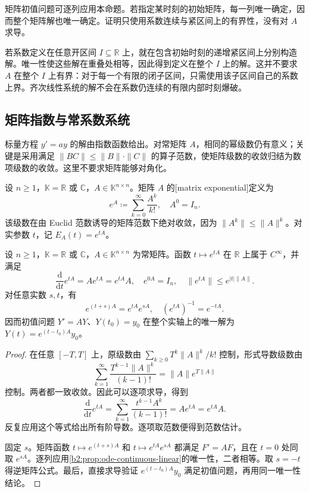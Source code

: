 矩阵初值问题可逐列应用本命题。若指定某时刻的初始矩阵，每一列唯一确定，因而整个矩阵解也唯一确定。证明只使用系数连续与紧区间上的有界性，没有对 \(A\) 求导。

\ProseParagraphBreak

若系数定义在任意开区间 \(I\subseteq\mathbb R\) 上，就在包含初始时刻的递增紧区间上分别构造解。唯一性使这些解在重叠处相等，因此得到定义在整个 \(I\) 上的解。这并不要求 \(A\) 在整个 \(I\) 上有界：对于每一个有限的闭子区间，只需使用该子区间自己的系数上界。齐次线性系统的解不会在系数仍连续的有限内部时刻爆破。

\subsection{矩阵指数与常系数系统}
\label{b2:subsec:070206}

标量方程 \(y'=ay\) 的解由指数函数给出。对常矩阵 \(A\)，相同的幂级数仍有意义；关键是采用满足 \(\|BC\|\leq\|B\|\cdot\|C\|\) 的算子范数，使矩阵级数的收敛归结为数项级数的收敛。这里不要求矩阵能够对角化。

\begin{definition}\label{b2:def:ode-matrix-exponential}
设 \(n\geq1\)，\(\mathbb K=\mathbb R\) 或 \(\mathbb C\)，\(A\in\mathbb K^{n\times n}\)。矩阵 \(A\) 的[matrix exponential]定义为
\[
 e^A\coloneqq\sum_{k=0}^{\infty}\frac{A^k}{k!},\quad A^0=I_n.
\]
该级数在由 Euclid 范数诱导的矩阵范数下绝对收敛，因为 \(\|A^k\|\leq\|A\|^k\)。对实参数 \(t\)，记 \(E_A(t)=e^{tA}\)。
\end{definition}

\begin{proposition}\label{b2:prop:ode-matrix-exponential}
设 \(n\geq1\)，\(\mathbb K=\mathbb R\) 或 \(\mathbb C\)，\(A\in\mathbb K^{n\times n}\) 为常矩阵。函数 \(t\mapsto e^{tA}\) 在 \(\mathbb R\) 上属于 \(C^\infty\)，并满足
\[
 \frac{\mathrm d}{\mathrm dt}e^{tA}=Ae^{tA}=e^{tA}A,
 \quad e^{0A}=I_n,
 \quad \|e^{tA}\|\leq e^{|t|\|A\|}.
\]
对任意实数 \(s,t\)，有
\[
 e^{(t+s)A}=e^{tA}e^{sA},\quad (e^{tA})^{-1}=e^{-tA}.
\]
因而初值问题 \(Y'=AY\)、\(Y(t_0)=y_0\) 在整个实轴上的唯一解为 \(Y(t)=e^{(t-t_0)A}y_0\)。
\end{proposition}
\begin{proof}
在任意 \([-T,T]\) 上，原级数由 \(\sum_{k\geq0}T^k\|A\|^k/k!\) 控制，形式导数级数由
\[
 \sum_{k=1}^{\infty}\frac{T^{k-1}\|A\|^k}{(k-1)!}
 =\|A\|e^{T\|A\|}
\]
控制。两者都一致收敛。因此可以逐项求导，得到
\[
 \frac{\mathrm d}{\mathrm dt}e^{tA}
 =\sum_{k=1}^{\infty}\frac{t^{k-1}A^k}{(k-1)!}
 =Ae^{tA}=e^{tA}A.
\]
反复应用这个等式给出所有阶导数。逐项取范数便得到范数估计。

固定 \(s\)。矩阵函数 \(t\mapsto e^{(t+s)A}\) 和 \(t\mapsto e^{tA}e^{sA}\) 都满足 \(F'=AF\)，且在 \(t=0\) 处同取 \(e^{sA}\)。逐列应用\cref{b2:prop:ode-continuous-linear}的唯一性，二者相等。取 \(s=-t\) 得逆矩阵公式。最后，直接求导验证 \(e^{(t-t_0)A}y_0\) 满足初值问题，再用同一唯一性结论。
\end{proof}

